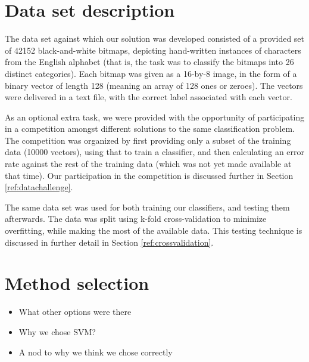 \documentclass{netsec2012}
\begin{document}
\section{Data set description}

The data set against which our solution was developed consisted of a provided set of 42152
black-and-white bitmaps, depicting hand-written instances of characters from the English alphabet
(that is, the task was to classify the bitmaps into 26 distinct categories).  Each bitmap was given
as a 16-by-8 image, in the form of a binary vector of length 128 (meaning an array of 128 ones or
zeroes).  The vectors were delivered in a text file, with the correct label associated with each
vector.

As an optional extra task, we were provided with the opportunity of participating in a competition
amongst different solutions to the same classification problem.  The competition was organized by
first providing only a subset of the training data (10000 vectors), using that to train a
classifier, and then calculating an error rate against the rest of the training data (which was not
yet made available at that time).  Our participation in the competition is discussed further in
Section \ref{ref:datachallenge}.

The same data set was used for both training our classifiers, and testing them afterwards.  The data
was split using k-fold cross-validation to minimize overfitting, while making the most of the
available data.  This testing technique is discussed in further detail in Section
\ref{ref:crossvalidation}.

%
%
%

\section{Method selection}

\begin{itemize}
\item What other options were there
\item Why we chose SVM?
\item A nod to why we think we chose correctly
\end{itemize}
\end{document}
